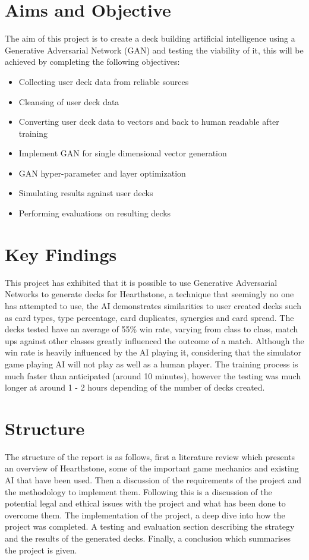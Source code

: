 \documentclass{report} %
\begin{document}
\section{Aims and Objective}
The aim of this project is to create a deck building artificial intelligence using a Generative Adversarial Network (GAN) and testing the viability of it, this will be achieved by completing the following objectives:
\begin{itemize}
  \item Collecting user deck data from reliable sources
  \item Cleansing of user deck data
  \item Converting user deck data to vectors and back to human readable after training
  \item Implement GAN for single dimensional vector generation
  \item GAN hyper-parameter and layer optimization
  \item Simulating results against user decks
  \item Performing evaluations on resulting decks
\end{itemize}
\section{Key Findings}
This project has exhibited that it is possible to use Generative Adversarial Networks to generate decks for Hearthstone, a technique that seemingly no one has attempted to use, the AI demonstrates similarities to user created decks such as card types, type percentage, card duplicates, synergies and card spread. The decks tested have an average of 55\% win rate, varying from class to class, match ups against other classes greatly influenced the outcome of a match. Although the win rate is heavily influenced by the AI playing it, considering that the simulator game playing AI will not play as well as a human player. The training process is much faster than anticipated (around 10 minutes), however the testing was much longer at around 1 - 2 hours depending of the number of decks created.
\section{Structure}
The structure of the report is as follows, first a literature review which presents an overview of Hearthstone, some of the important game mechanics and existing AI that have been used. Then a discussion  of  the  requirements  of  the  project  and  the  methodology  to implement them. Following this is a discussion of the potential legal and ethical issues with the project and what has been done to overcome them. The implementation of the project, a deep dive into how the project was completed. A testing and evaluation section describing the strategy and the results of the generated decks. Finally, a conclusion which summarises the project is given.
\end{document}
